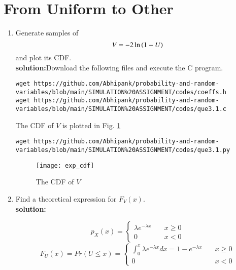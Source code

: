 \documentclass[journal,12pt,twocolumn]{IEEEtran}
\renewcommand\thesection{\arabic{section}}
\begin{document}
\section{From Uniform to Other}
\begin{enumerate}[label=\thesection.\arabic*
,ref=\thesection.\theenumi]
%
\item
Generate samples of 
%
\begin{equation}
V = -2\ln\left(1-U\right)
\end{equation}
%
and plot its CDF.\\
\textbf{solution:}Download the following files and execute the  C program.
\begin{lstlisting}
wget https://github.com/Abhipank/probability-and-random-variables/blob/main/SIMULATION%20ASSIGNMENT/codes/coeffs.h
wget https://github.com/Abhipank/probability-and-random-variables/blob/main/SIMULATION%20ASSIGNMENT/codes/que3.1.c
\end{lstlisting}
The CDF of $V$ is plotted in Fig. \ref{fig:exp_cdf}
\begin{lstlisting}
wget https://github.com/Abhipank/probability-and-random-variables/blob/main/SIMULATION%20ASSIGNMENT/codes/que3.1.py
\end{lstlisting}
\begin{figure}
\centering
\texttt{[image: exp\_cdf]}
\caption{The CDF of $V$}
\label{fig:exp_cdf}
\end{figure}

\item Find a theoretical expression for $F_V(x)$.\\
\textbf{solution:}

\begin{equation}
p_X(x) = \left\{
        \begin{array}{ll}
            \lambda e^{-\lambda x} & \quad x \geq 0\\
            0 & \quad x < 0
        \end{array}
    \right.
\end{equation}
\begin{equation}
F_U(x) =Pr(U \leq x)= \left\{
        \begin{array}{ll}
            \int_{0}^x \lambda e^{-\lambda x}dx=1 -e^{-\lambda x} & \quad x \geq 0\\
            0 & \quad x < 0
        \end{array}
    \right.  
\end{equation}

%
\end{enumerate}
\end{document}
